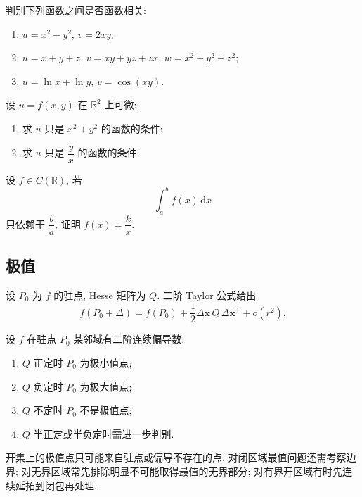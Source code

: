 \documentclass[../数学分析培优讲义.tex]{subfiles}
\begin{document}
\begin{example}
判别下列函数之间是否函数相关:
\begin{enumerate}[label=(\arabic*)]
    \item $u=x^2-y^2$, $v=2xy$;
    \item $u=x+y+z$, $v=xy+yz+zx$, $w=x^2+y^2+z^2$;
    \item $u=\ln x+\ln y$, $v=\cos(xy)$.
\end{enumerate}
\end{example}
\exampleblank

\begin{example}
设 $u=f(x,y)$ 在 $\mathbb{R}^2$ 上可微:
\begin{enumerate}[label=(\arabic*)]
    \item 求 $u$ 只是 $x^2+y^2$ 的函数的条件;
    \item 求 $u$ 只是 $\dfrac{y}{x}$ 的函数的条件.
\end{enumerate}
\end{example}
\exampleblank

\begin{example}
设 $f\in C(\mathbb{R})$, 若
\[
    \int_a^bf(x)\,\mathrm{d}x
\]
只依赖于 $\dfrac{b}{a}$, 证明 $f(x)=\dfrac{k}{x}$.
\end{example}
\exampleblank


\newpage

\subsection{极值}



设 $P_0$ 为 $f$ 的驻点, Hesse 矩阵为 $Q$. 二阶 Taylor 公式给出
\[
    f(P_0+\Delta)=f(P_0)+\dfrac{1}{2}\Delta\bm x\,Q\,\Delta\bm x^{\mathsf T}+o(r^2).
\]

\begin{theorem}[\markstar]
设 $f$ 在驻点 $P_0$ 某邻域有二阶连续偏导数:
\begin{enumerate}[label=(\arabic*)]
    \item $Q$ 正定时 $P_0$ 为极小值点;
    \item $Q$ 负定时 $P_0$ 为极大值点;
    \item $Q$ 不定时 $P_0$ 不是极值点;
    \item $Q$ 半正定或半负定时需进一步判别.
\end{enumerate}
\end{theorem}

\begin{remark}
开集上的极值点只可能来自驻点或偏导不存在的点. 对闭区域最值问题还需考察边界; 对无界区域常先排除明显不可能取得最值的无界部分; 对有界开区域有时先连续延拓到闭包再处理.
\end{remark}
\end{document}
